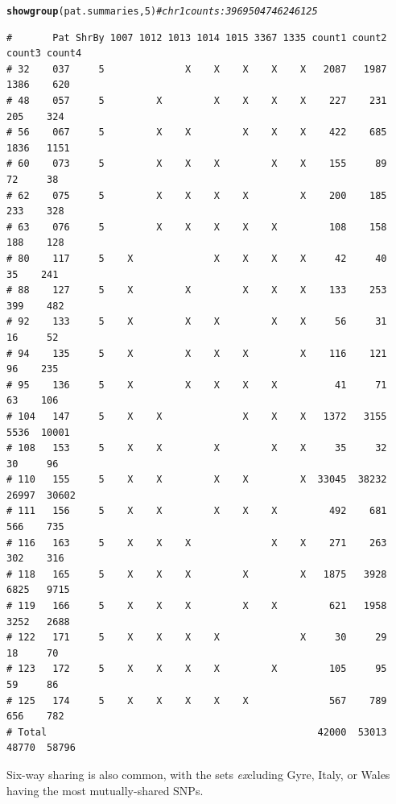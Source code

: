 \documentclass{article}\usepackage[]{graphicx}\usepackage[]{color}
\makeatletter
\newcommand{\hlnum}[1]{\textcolor[rgb]{0.686,0.059,0.569}{#1}}%
\newcommand{\hlcom}[1]{\textcolor[rgb]{0.678,0.584,0.686}{\textit{#1}}}%
\newcommand{\hlstd}[1]{\textcolor[rgb]{0.345,0.345,0.345}{#1}}%
\newcommand{\hlkwd}[1]{\textcolor[rgb]{0.737,0.353,0.396}{\textbf{#1}}}%
\newenvironment{kframe}{%
 \def\at@end@of@kframe{}%
 \ifinner\ifhmode%
  \def\at@end@of@kframe{\end{minipage}}%
  \begin{minipage}{\columnwidth}%
 \fi\fi%
 \def\FrameCommand##1{\hskip\@totalleftmargin \hskip-\fboxsep
 \colorbox{shadecolor}{##1}\hskip-\fboxsep
     \hskip-\linewidth \hskip-\@totalleftmargin \hskip\columnwidth}%
 \MakeFramed {\advance\hsize-\width
   \@totalleftmargin\z@ \linewidth\hsize
   \@setminipage}}%
 {\par\unskip\endMakeFramed%
 \at@end@of@kframe}
\newenvironment{knitrout}{}{} %
\makeatother
\begin{document}
\begin{knitrout}\footnotesize
{}\color{fgcolor}\begin{kframe}
\begin{alltt}
\hlkwd{showgroup}\hlstd{(pat.summaries,}\hlnum{5}\hlstd{)} \hlcom{# chr 1 counts: 3969   5047   4624  6125}
\end{alltt}
\begin{verbatim}
#       Pat ShrBy 1007 1012 1013 1014 1015 3367 1335 count1 count2 count3 count4
# 32    037     5              X    X    X    X    X   2087   1987   1386    620
# 48    057     5         X         X    X    X    X    227    231    205    324
# 56    067     5         X    X         X    X    X    422    685   1836   1151
# 60    073     5         X    X    X         X    X    155     89     72     38
# 62    075     5         X    X    X    X         X    200    185    233    328
# 63    076     5         X    X    X    X    X         108    158    188    128
# 80    117     5    X              X    X    X    X     42     40     35    241
# 88    127     5    X         X         X    X    X    133    253    399    482
# 92    133     5    X         X    X         X    X     56     31     16     52
# 94    135     5    X         X    X    X         X    116    121     96    235
# 95    136     5    X         X    X    X    X          41     71     63    106
# 104   147     5    X    X              X    X    X   1372   3155   5536  10001
# 108   153     5    X    X         X         X    X     35     32     30     96
# 110   155     5    X    X         X    X         X  33045  38232  26997  30602
# 111   156     5    X    X         X    X    X         492    681    566    735
# 116   163     5    X    X    X              X    X    271    263    302    316
# 118   165     5    X    X    X         X         X   1875   3928   6825   9715
# 119   166     5    X    X    X         X    X         621   1958   3252   2688
# 122   171     5    X    X    X    X              X     30     29     18     70
# 123   172     5    X    X    X    X         X         105     95     59     86
# 125   174     5    X    X    X    X    X              567    789    656    782
# Total                                               42000  53013  48770  58796
\end{verbatim}
\end{kframe}
\end{knitrout}

Six-way sharing is also common, with the sets \emph{ex}cluding Gyre, Italy, or Wales having the most mutually-shared SNPs.
\end{document}
